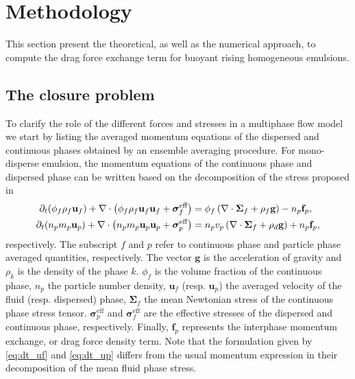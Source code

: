 \section{Methodology}
\label{sec:methodology_drag}
This section present the theoretical, as well as the numerical approach, to compute the drag force exchange term for buoyant rising homogeneous emulsions.

\subsection{The closure problem}
To clarify the role of the different forces and stresses in a multiphase flow model we start by listing the averaged momentum equations of the dispersed and continuous phases obtained by an ensemble averaging procedure.
For mono-disperse emulsion, the momentum equations of the continuous phase and dispersed phase can be written based on the decomposition of the stress proposed in \citet{chap:daniel2}
\begin{align}
    \pddt (\phi_f\rho_f \textbf{u}_f)
    + \div \left(\phi_f\rho_f \textbf{u}_f\textbf{u}_f + \bm{\sigma}_f^{\text{eff}}\right)
    &= \phi_f 
    \left(\div \bm{\Sigma}_f
    + \rho_f \textbf{g}\right)
    - n_p \textbf{f}_p, 
    \label{eq:dt_uf}
    \\
    \pddt (n_p  m_p  \textbf{u}_p)
    + \div \left(n_p m_p  \textbf{u}_p\textbf{u}_p
    +  \bm{\sigma}_p^{\text{eff}}\right)
    &= 
    n_p v_p \left(\div \bm{\Sigma}_f
    + \rho_d \textbf{g}\right)
    + n_p \textbf{f}_p, 
    \label{eq:dt_up}
\end{align}
respectively. 
The subscript $f$ and $p$ refer to continuous phase and particle phase averaged quantities, respectively.
The vector $\textbf{g}$ is the acceleration of gravity and $\rho_k$ is the density of the phase $k$. 
$\phi_f$ is the volume fraction of the continuous phase, $n_p$ the particle number density, $\textbf{u}_f$ (resp. $\textbf{u}_p$) the averaged velocity of the fluid (resp. dispersed) phase, $\bm{\Sigma}_f$ the mean Newtonian stress of the continuous phase stress tensor.
$\bm{\sigma}^{\text{eff}}_p$ and $\bm{\sigma}^{\text{eff}}_f$ are the effective stresses of the dispersed and continuous phase, respectively.  
Finally, $\textbf{f}_p$ represents the interphase momentum exchange, or drag force density term. 
Note that the formulation given by \ref{eq:dt_uf} and \ref{eq:dt_up} differs from the usual momentum expression \citep{wang2021numerical,wang2024effect} in their decomposition of the mean fluid phase stress. 

